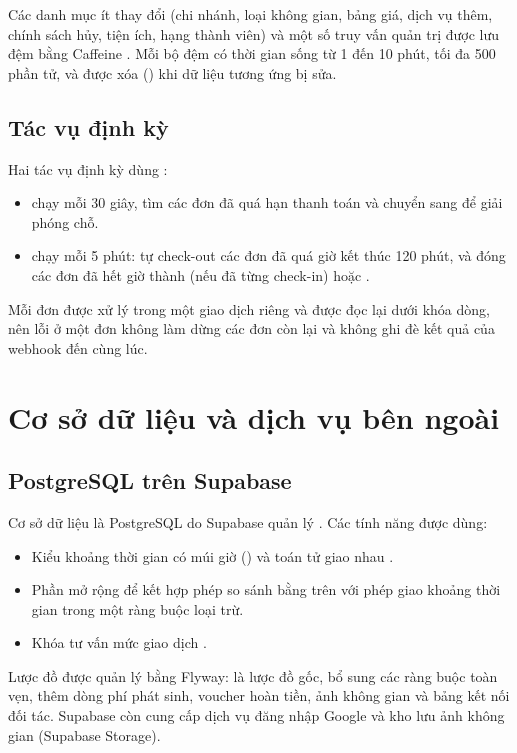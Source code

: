 Các danh mục ít thay đổi (chi nhánh, loại không gian, bảng giá, dịch vụ thêm, chính sách hủy, tiện ích, hạng thành viên) và một số truy vấn quản trị được lưu đệm bằng Caffeine \cite{caffeine_github}. Mỗi bộ đệm có thời gian sống từ 1 đến 10 phút, tối đa 500 phần tử, và được xóa () khi dữ liệu tương ứng bị sửa.

\subsection{Tác vụ định kỳ}
Hai tác vụ định kỳ dùng :
\begin{itemize}
    \item {} chạy mỗi 30 giây, tìm các đơn  đã quá hạn thanh toán và chuyển sang  để giải phóng chỗ.
    \item {} chạy mỗi 5 phút: tự check-out các đơn  đã quá giờ kết thúc 120 phút, và đóng các đơn  đã hết giờ thành  (nếu đã từng check-in) hoặc .
\end{itemize}
Mỗi đơn được xử lý trong một giao dịch riêng và được đọc lại dưới khóa dòng, nên lỗi ở một đơn không làm dừng các đơn còn lại và không ghi đè kết quả của webhook đến cùng lúc.

\section{Cơ sở dữ liệu và dịch vụ bên ngoài}
\label{sec:cn_database}

\subsection{PostgreSQL trên Supabase}
Cơ sở dữ liệu là PostgreSQL \cite{postgresql_documentation} do Supabase quản lý \cite{supabase_docs}. Các tính năng được dùng:
\begin{itemize}
    \item Kiểu khoảng thời gian có múi giờ () và toán tử giao nhau \mt{\&\&}.
    \item Phần mở rộng  để kết hợp phép so sánh bằng trên  với phép giao khoảng thời gian trong một ràng buộc loại trừ.
    \item Khóa tư vấn mức giao dịch .
\end{itemize}
Lược đồ được quản lý bằng Flyway:  là lược đồ gốc,  bổ sung các ràng buộc toàn vẹn,  thêm dòng phí phát sinh, voucher hoàn tiền, ảnh không gian và bảng kết nối đối tác. Supabase còn cung cấp dịch vụ đăng nhập Google và kho lưu ảnh không gian (Supabase Storage).

